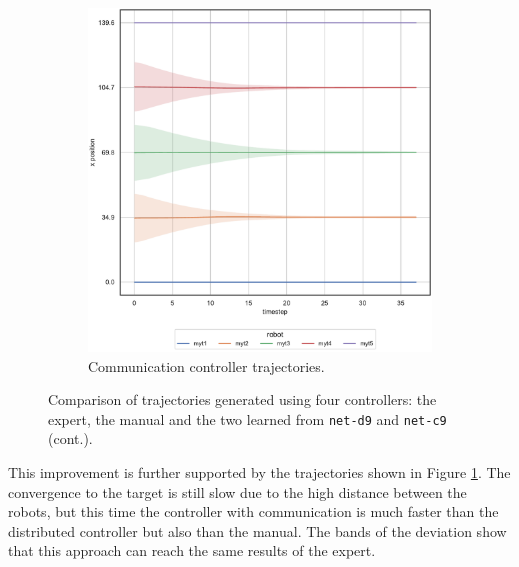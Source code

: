 \begin{figure}[!htb]
\begin{center}
\begin{subfigure}[h]{0.49\textwidth}
			\includegraphics[width=\textwidth]{contents/images/net-c9/position-overtime-learned_communication}
			\caption{Communication controller trajectories.}
		\end{subfigure}
	\end{center}
	\vspace{-0.5cm}
	\caption[]{Comparison of trajectories generated using four controllers: the 
		expert, the manual and the two learned from \texttt{net-d9} and 
		\texttt{net-c9} (cont.).}
	\label{fig:net-c9traj}
\end{figure}
This improvement is further supported by the trajectories shown in Figure 
\ref{fig:net-c9traj}. 
The convergence to the target is still slow due to the high distance between the 
robots, but this time the controller with communication is much faster than the 
distributed controller but also than the manual. The bands of the deviation show 
that this approach can reach the same results of the expert.


